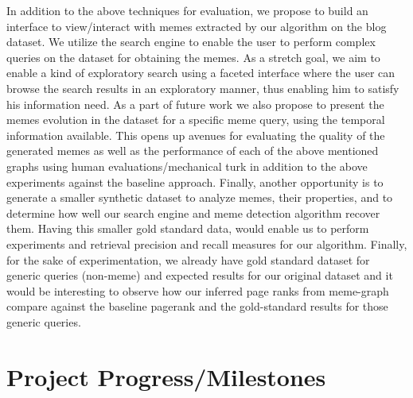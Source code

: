 \documentclass{acm_proc_article-sp}
\begin{document}
In addition to the above techniques for evaluation, we propose to build an interface to view/interact with memes extracted by our algorithm on the blog dataset. We utilize the search engine to enable the user to perform complex queries on the dataset for obtaining the memes. As a stretch goal, we aim to enable a kind of exploratory search using a faceted interface where the user can browse the search results in an exploratory manner, thus enabling him to satisfy his information need. As a part of future work we also propose to present the memes evolution in the dataset for a specific meme query, using the temporal information available. This opens up avenues for evaluating the quality of the generated memes as well as the performance of each of the above mentioned graphs using human evaluations/mechanical turk in addition to the above experiments against the baseline approach. Finally, another opportunity is to generate a smaller synthetic dataset to analyze memes, their properties, and to determine how well our search engine and meme detection algorithm recover them. Having this smaller gold standard data, would enable us to perform experiments and retrieval precision and recall measures for our algorithm. Finally, for the sake of experimentation, we already have gold standard dataset for generic queries (non-meme) and expected results for our original dataset and it would be interesting to observe how our inferred page ranks from meme-graph compare against the baseline pagerank and the gold-standard results for those generic queries.

\section{Project Progress/Milestones}
\end{document}
